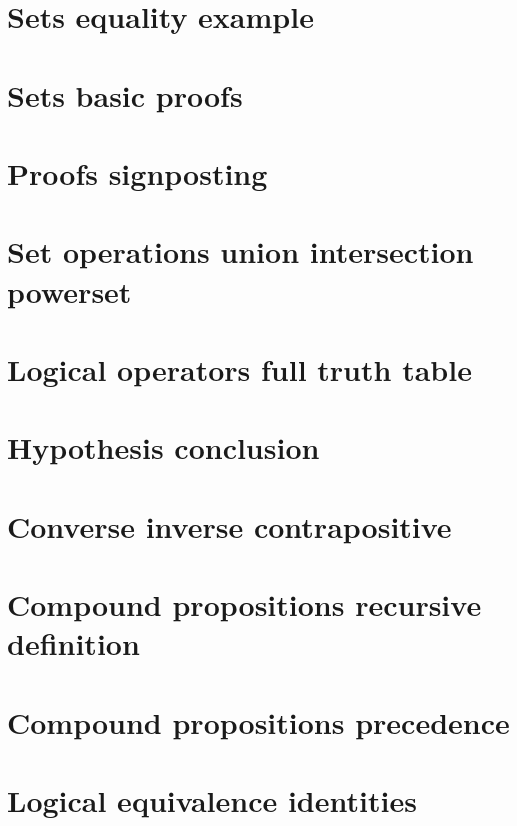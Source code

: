 \section*{Sets equality example}

\vfill
\section*{Sets basic proofs}

\vfill
\section*{Proofs signposting}

\vfill
\section*{Set operations union intersection powerset}

\vfill
\section*{Logical operators full truth table}

\vfill
\section*{Hypothesis conclusion}

\vfill
\section*{Converse inverse contrapositive}

\vfill
\section*{Compound propositions recursive definition}

\vfill
\section*{Compound propositions precedence}

\vfill
\section*{Logical equivalence identities}

\vfill
